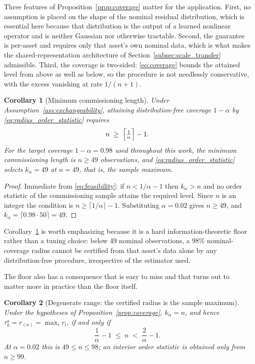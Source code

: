 \documentclass[a4paper]{cas-sc}
\newtheorem{corollary}{Corollary}
\newcommand{\residual}{\ensuremath{r}}
\begin{document}
Three features of Proposition~\ref{prop:coverage} matter for the
application. First, no assumption is placed on the shape of the nominal
residual distribution, which is essential here because that distribution is
the output of a learned nonlinear operator and is neither Gaussian nor
otherwise tractable. Second, the guarantee is per-asset and requires only
that asset's own nominal data, which is what makes the shared-representation
architecture of Section~\ref{subsec:scale_transfer} admissible. Third, the
coverage is two-sided: \eqref{eq:coverage} bounds the attained level from
above as well as below, so the procedure is not needlessly conservative,
with the excess vanishing at rate \(1/(n+1)\).

\begin{corollary}[Minimum commissioning length]
\label{cor:min_commissioning}
Under Assumption~\ref{ass:exchangeability}, attaining distribution-free
coverage \(1-\alpha\) by \eqref{eq:radius_order_statistic} requires
\begin{equation}
n \;\ge\; \Bigl\lceil \tfrac{1}{\alpha} \Bigr\rceil - 1 .
\label{eq:min_n}
\end{equation}
For the target coverage \(1-\alpha=0.98\) used throughout this work, the
minimum commissioning length is \(n\ge 49\) observations, and
\eqref{eq:radius_order_statistic} selects \(k_\alpha=49\) at \(n=49\), that
is, the sample maximum.
\end{corollary}

\begin{proof}
Immediate from \eqref{eq:feasibility}: if \(n<1/\alpha-1\) then
\(k_\alpha>n\) and no order statistic of the commissioning sample attains
the required level. Since \(n\) is an integer the condition is
\(n\ge\lceil 1/\alpha\rceil-1\). Substituting \(\alpha=0.02\) gives
\(n\ge 49\), and \(k_\alpha=\lceil 0.98\cdot 50\rceil = 49\).
\end{proof}

Corollary~\ref{cor:min_commissioning} is worth emphasizing because it is a
hard information-theoretic floor rather than a tuning choice: below 49
nominal observations, a \(98\%\) nominal-coverage radius cannot be
certified from that asset's data alone by any distribution-free procedure,
irrespective of the estimator used.

The floor also has a consequence that is easy to miss and that turns out to
matter more in practice than the floor itself.

\begin{corollary}[Degenerate range: the certified radius is the sample maximum]
\label{cor:degenerate_range}
Under the hypotheses of Proposition~\ref{prop:coverage},
\(k_\alpha = n\), and hence
\(\tau_k^\star = \residual_{(n)} = \max_i \residual_i\), if and only if
\begin{equation}
\frac{1}{\alpha}-1 \;\le\; n \;<\; \frac{2}{\alpha}-1 .
\label{eq:degenerate_range}
\end{equation}
At \(\alpha=0.02\) this is \(49\le n\le 98\); an interior order statistic is
obtained only from \(n\ge 99\).
\end{corollary}
\end{document}
